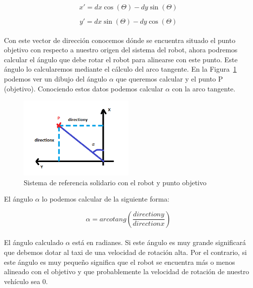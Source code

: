 \begin{equation} 
x' = dx \cos(\Theta) - dy \sin(\Theta)
\end{equation}

\begin{equation} 
y' = dx \sin(\Theta) - dy \cos(\Theta)
\end{equation}
\\

Con este vector de dirección conocemos dónde se encuentra situado el punto objetivo con respecto a nuestro origen del sistema del robot, ahora podremos calcular el ángulo que debe rotar el robot para alinearse con este punto. Este ángulo lo calcularemos mediante el cálculo del arco tangente. En la Figura~\ref{fig.Triangulo_gpp} podemos ver un dibujo del ángulo \(\alpha\) que queremos calcular y el punto P (objetivo). Conociendo estos datos podemos calcular \(\alpha\) con la arco tangente.

\begin{figure}[H]
  \begin{center}
    \includegraphics[width=0.5\textwidth]{figures/GPP/Triangulo.png}
		\caption{Sistema de referencia solidario con el robot y punto objetivo}
		\label{fig.Triangulo_gpp}
		\end{center}
\end{figure}

El ángulo \(\alpha\) lo podemos calcular de la siguiente forma:

\begin{equation} 
\alpha = arcotang\left(\frac{directiony}{directionx}\right)
\end{equation}
\\

El ángulo calculado \(\alpha\) está en radianes. Si este ángulo es muy grande significará que debemos dotar al taxi de una velocidad de rotación alta. Por el contrario, si este ángulo es muy pequeño significa que el robot se encuentra más o menos alineado con el objetivo y que probablemente la velocidad de rotación de nuestro vehículo sea 0.\\

